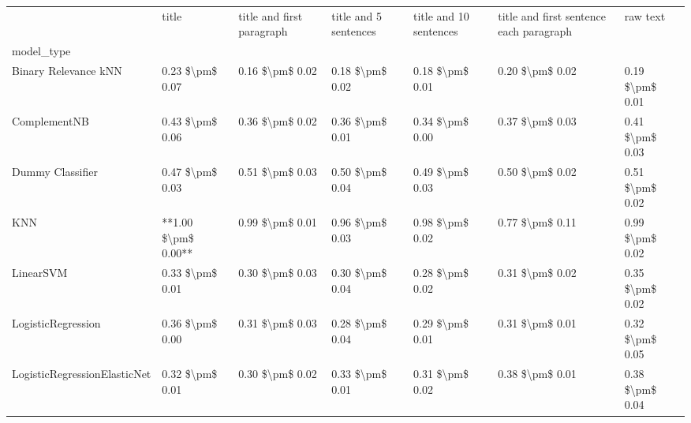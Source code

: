 \begin{tabular}{lllllll}
\toprule
{} &                title & title and first paragraph & title and 5 sentences & title and 10 sentences & title and first sentence each paragraph &         raw text \\
model\_type                      &                      &                           &                       &                        &                                         &                  \\
\midrule
Binary Relevance kNN            &      0.23 \$\textbackslash pm\$ 0.07 &           0.16 \$\textbackslash pm\$ 0.02 &       0.18 \$\textbackslash pm\$ 0.02 &        0.18 \$\textbackslash pm\$ 0.01 &                         0.20 \$\textbackslash pm\$ 0.02 &  0.19 \$\textbackslash pm\$ 0.01 \\
ComplementNB                    &      0.43 \$\textbackslash pm\$ 0.06 &           0.36 \$\textbackslash pm\$ 0.02 &       0.36 \$\textbackslash pm\$ 0.01 &        0.34 \$\textbackslash pm\$ 0.00 &                         0.37 \$\textbackslash pm\$ 0.03 &  0.41 \$\textbackslash pm\$ 0.03 \\
Dummy Classifier                &      0.47 \$\textbackslash pm\$ 0.03 &           0.51 \$\textbackslash pm\$ 0.03 &       0.50 \$\textbackslash pm\$ 0.04 &        0.49 \$\textbackslash pm\$ 0.03 &                         0.50 \$\textbackslash pm\$ 0.02 &  0.51 \$\textbackslash pm\$ 0.02 \\
KNN                             &  **1.00 \$\textbackslash pm\$ 0.00** &           0.99 \$\textbackslash pm\$ 0.01 &       0.96 \$\textbackslash pm\$ 0.03 &        0.98 \$\textbackslash pm\$ 0.02 &                         0.77 \$\textbackslash pm\$ 0.11 &  0.99 \$\textbackslash pm\$ 0.02 \\
LinearSVM                       &      0.33 \$\textbackslash pm\$ 0.01 &           0.30 \$\textbackslash pm\$ 0.03 &       0.30 \$\textbackslash pm\$ 0.04 &        0.28 \$\textbackslash pm\$ 0.02 &                         0.31 \$\textbackslash pm\$ 0.02 &  0.35 \$\textbackslash pm\$ 0.02 \\
LogisticRegression              &      0.36 \$\textbackslash pm\$ 0.00 &           0.31 \$\textbackslash pm\$ 0.03 &       0.28 \$\textbackslash pm\$ 0.04 &        0.29 \$\textbackslash pm\$ 0.01 &                         0.31 \$\textbackslash pm\$ 0.01 &  0.32 \$\textbackslash pm\$ 0.05 \\
LogisticRegressionElasticNet    &      0.32 \$\textbackslash pm\$ 0.01 &           0.30 \$\textbackslash pm\$ 0.02 &       0.33 \$\textbackslash pm\$ 0.01 &        0.31 \$\textbackslash pm\$ 0.02 &                         0.38 \$\textbackslash pm\$ 0.01 &  0.38 \$\textbackslash pm\$ 0.04 \\

\end{tabular}
